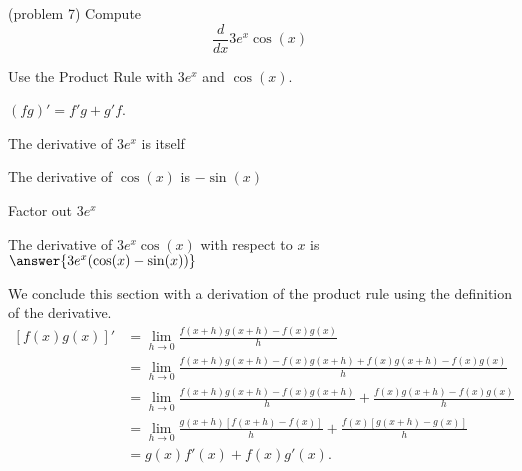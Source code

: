 \documentclass[handout]{ximera}
\begin{document}
\begin{problem}(problem 7)
  Compute
  \[
  \frac{d}{dx} 3e^x \cos(x)
  \]
  
    \begin{hint}
      Use the Product Rule with $3e^x$ and $\cos(x)$.
    \end{hint}
    \begin{hint}
      $(fg)' = f'g+g'f$.
    \end{hint}
    \begin{hint}
      The derivative of $3e^x$ is itself
    \end{hint}
    \begin{hint}
      The derivative of $\cos(x)$ is $-\sin(x)$
    \end{hint}
		\begin{hint}
      Factor out $3e^x$
    \end{hint}
		The derivative of $3e^x\cos(x)$ with respect to $x$ is
		 $\answer{3e^x(\cos(x) - \sin(x))}$
		
\end{problem}




\begin{center}
\begin{foldable}
\end{foldable}
\end{center}

We conclude this section with a derivation of the product rule using the definition of the derivative.
\begin{align*}
\left[f(x)g(x)\right]' &= \lim_{h \to 0} \frac{f(x+h)g(x+h)-f(x)g(x)}{h}\\[5pt] 
&= \lim_{h \to 0} \frac{f(x+h)g(x+h)- f(x)g(x+h) + f(x)g(x+h) - f(x)g(x)}{h}\\[5pt] 
&= \lim_{h \to 0} \frac{f(x+h)g(x+h)- f(x)g(x+h)}{h} + \frac{f(x)g(x+h) - f(x)g(x)}{h} \\[5pt] 
&=  \lim_{h \to 0} \frac{g(x+h)\left[f(x+h)- f(x)\right]}{h} + \frac{f(x)\left[g(x+h) - g(x)\right]}{h}\\[5pt] 
&= g(x)f'(x) + f(x)g'(x).
\end{align*}
\end{document}
